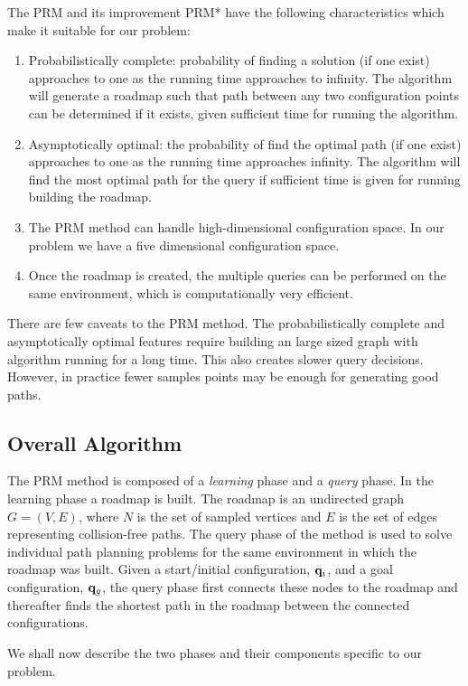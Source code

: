 \documentclass[12pt,a4paper, onecolumn]{IEEEtran}
\begin{document}
The PRM and its improvement PRM* have the following characteristics which make it suitable for our problem:
\begin{enumerate}
  \item Probabilistically complete: probability of finding a solution (if one exist)
    approaches to one as the running time approaches to infinity. The algorithm will generate a roadmap such that path between any two configuration points can be determined if it exists, given sufficient
    time for running the algorithm.
  \item Asymptotically optimal: the probability of find the optimal path (if one exist) approaches to
    one as the running time approaches infinity. The algorithm will find the most optimal path for the query if sufficient time is given for running building the roadmap.
  \item The PRM method can handle high-dimensional configuration space. In our problem we
    have a five dimensional configuration space.
  \item Once the roadmap is created, the multiple queries can be performed on the same
    environment, which is computationally very efficient.
\end{enumerate}

There are few caveats to the PRM method. The probabilistically complete and asymptotically
optimal features require building an large sized graph with algorithm running for a
long time. This also creates slower query decisions. However, in practice fewer samples
points may be enough for generating good paths.

\subsection{Overall Algorithm}
The PRM method is composed of a {\em learning} phase and a {\em query} phase. In the
learning phase a roadmap is built. The roadmap is an undirected graph $G=(V, E)$, where
$N$ is the set of sampled vertices and $E$ is the set of edges representing collision-free
paths. The query phase of the method is used to solve individual path planning problems
for the same environment in which the roadmap was built. Given a start/initial
configuration, $\mathbf{q}_i$, and a goal configuration, $\mathbf{q}_g$, the query phase first connects
these nodes to the roadmap and thereafter finds the shortest path in the roadmap between
the connected configurations.

We shall now describe the two phases and their components specific to our problem.
\end{document}
